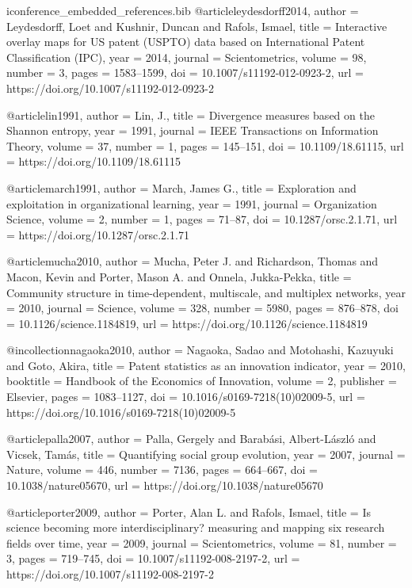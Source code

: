 \begin{filecontents*}[overwrite]{iconference_embedded_references.bib}
@article{leydesdorff2014,
  author = {Leydesdorff, Loet and Kushnir, Duncan and Rafols, Ismael},
  title = {Interactive overlay maps for {US} patent ({USPTO}) data based on {International Patent Classification} ({IPC})},
  year = {2014},
  journal = {Scientometrics},
  volume = {98},
  number = {3},
  pages = {1583--1599},
  doi = {10.1007/s11192-012-0923-2},
  url = {https://doi.org/10.1007/s11192-012-0923-2}
}

@article{lin1991,
  author = {Lin, J.},
  title = {Divergence measures based on the {Shannon} entropy},
  year = {1991},
  journal = {IEEE Transactions on Information Theory},
  volume = {37},
  number = {1},
  pages = {145--151},
  doi = {10.1109/18.61115},
  url = {https://doi.org/10.1109/18.61115}
}

@article{march1991,
  author = {March, James G.},
  title = {Exploration and exploitation in organizational learning},
  year = {1991},
  journal = {Organization Science},
  volume = {2},
  number = {1},
  pages = {71--87},
  doi = {10.1287/orsc.2.1.71},
  url = {https://doi.org/10.1287/orsc.2.1.71}
}

@article{mucha2010,
  author = {Mucha, Peter J. and Richardson, Thomas and Macon, Kevin and Porter, Mason A. and Onnela, Jukka-Pekka},
  title = {Community structure in time-dependent, multiscale, and multiplex networks},
  year = {2010},
  journal = {Science},
  volume = {328},
  number = {5980},
  pages = {876--878},
  doi = {10.1126/science.1184819},
  url = {https://doi.org/10.1126/science.1184819}
}

@incollection{nagaoka2010,
  author = {Nagaoka, Sadao and Motohashi, Kazuyuki and Goto, Akira},
  title = {Patent statistics as an innovation indicator},
  year = {2010},
  booktitle = {Handbook of the Economics of Innovation},
  volume = {2},
  publisher = {Elsevier},
  pages = {1083--1127},
  doi = {10.1016/s0169-7218(10)02009-5},
  url = {https://doi.org/10.1016/s0169-7218(10)02009-5}
}

@article{palla2007,
  author = {Palla, Gergely and Barab{\'{a}}si, Albert-L{\'{a}}szl{\'{o}} and Vicsek, Tam{\'{a}}s},
  title = {Quantifying social group evolution},
  year = {2007},
  journal = {Nature},
  volume = {446},
  number = {7136},
  pages = {664--667},
  doi = {10.1038/nature05670},
  url = {https://doi.org/10.1038/nature05670}
}

@article{porter2009,
  author = {Porter, Alan L. and Rafols, Ismael},
  title = {Is science becoming more interdisciplinary? measuring and mapping six research fields over time},
  year = {2009},
  journal = {Scientometrics},
  volume = {81},
  number = {3},
  pages = {719--745},
  doi = {10.1007/s11192-008-2197-2},
  url = {https://doi.org/10.1007/s11192-008-2197-2}
}


\end{filecontents*}
